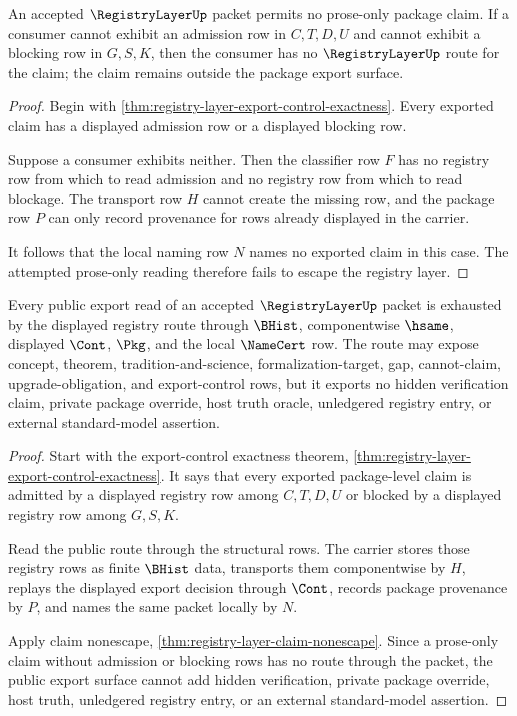 \begin{theorem}
\label{thm:registry-layer-claim-nonescape}
An accepted $\RegistryLayerUp$ packet permits no prose-only package claim. If a consumer cannot exhibit an admission row in $C,T,D,U$ and cannot exhibit a blocking row in $G,S,K$, then the consumer has no $\RegistryLayerUp$ route for the claim; the claim remains outside the package export surface.
\end{theorem}
\begin{proof}
Begin with \autoref{thm:registry-layer-export-control-exactness}. Every exported claim has a displayed admission row or a displayed blocking row.

Suppose a consumer exhibits neither. Then the classifier row $F$ has no registry row from which to read admission and no registry row from which to read blockage. The transport row $H$ cannot create the missing row, and the package row $P$ can only record provenance for rows already displayed in the carrier.

It follows that the local naming row $N$ names no exported claim in this case. The attempted prose-only reading therefore fails to escape the registry layer.
\end{proof}

\begin{theorem}
\label{thm:registrylayer-public-export-route}
Every public export read of an accepted $\RegistryLayerUp$ packet is exhausted by the displayed registry route through $\BHist$, componentwise $\hsame$, displayed $\Cont$, $\Pkg$, and the local $\NameCert$ row. The route may expose concept, theorem, tradition-and-science, formalization-target, gap, cannot-claim, upgrade-obligation, and export-control rows, but it exports no hidden verification claim, private package override, host truth oracle, unledgered registry entry, or external standard-model assertion.
\end{theorem}
\begin{proof}
Start with the export-control exactness theorem, \autoref{thm:registry-layer-export-control-exactness}. It says that every exported package-level claim is admitted by a displayed registry row among $C,T,D,U$ or blocked by a displayed registry row among $G,S,K$.

Read the public route through the structural rows. The carrier stores those registry rows as finite $\BHist$ data, transports them componentwise by $H$, replays the displayed export decision through $\Cont$, records package provenance by $P$, and names the same packet locally by $N$.

Apply claim nonescape, \autoref{thm:registry-layer-claim-nonescape}. Since a prose-only claim without admission or blocking rows has no route through the packet, the public export surface cannot add hidden verification, private package override, host truth, unledgered registry entry, or an external standard-model assertion.
\end{proof}

